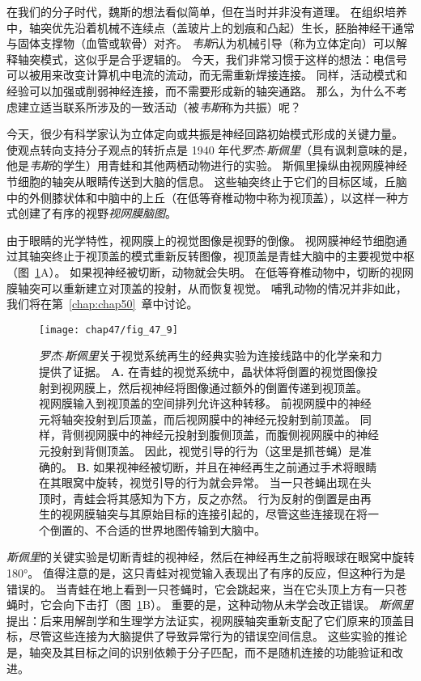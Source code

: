 在我们的分子时代，魏斯的想法看似简单，但在当时并非没有道理。
在组织培养中，轴突优先沿着机械不连续点（盖玻片上的划痕和凸起）生长，胚胎神经干通常与固体支撑物（血管或软骨）对齐。
\textit{韦斯}认为机械引导（称为立体定向）可以解释轴突模式，这似乎是合乎逻辑的。
今天，我们非常习惯于这样的想法：电信号可以被用来改变计算机中电流的流动，而无需重新焊接连接。
同样，活动模式和经验可以加强或削弱神经连接，而不需要形成新的轴突通路。
那么，为什么不考虑建立适当联系所涉及的一致活动（被\textit{韦斯}称为共振）呢？


今天，很少有科学家认为立体定向或共振是神经回路初始模式形成的关键力量。
使观点转向支持分子观点的转折点是 1940 年代\textit{罗杰$\cdot$斯佩里}（具有讽刺意味的是，他是\textit{韦斯}的学生）用青蛙和其他两栖动物进行的实验。
斯佩里操纵由视网膜神经节细胞的轴突从眼睛传送到大脑的信息。
这些轴突终止于它们的目标区域，丘脑中的外侧膝状体和中脑中的上丘（在低等脊椎动物中称为视顶盖），以这样一种方式创建了有序的视野\textit{视网膜脑图}。


由于眼睛的光学特性，视网膜上的视觉图像是视野的倒像。
视网膜神经节细胞通过其轴突终止于视顶盖的模式重新反转图像，视顶盖是青蛙大脑中的主要视觉中枢（图~\ref{fig:47_9}A）。
如果视神经被切断，动物就会失明。
在低等脊椎动物中，切断的视网膜轴突可以重新建立对顶盖的投射，从而恢复视觉。
哺乳动物的情况并非如此，我们将在第~\ref{chap:chap50}~章中讨论。


\begin{figure}[htbp]
	\centering
	\texttt{[image: chap47/fig\_47\_9]}
	\caption{\textit{罗杰$\cdot$斯佩里}关于视觉系统再生的经典实验为连接线路中的化学亲和力提供了证据。
		\textbf{A.} 在青蛙的视觉系统中，晶状体将倒置的视觉图像投射到视网膜上，然后视神经将图像通过额外的倒置传递到视顶盖。
		视网膜输入到视顶盖的空间排列允许这种转移。
		前视网膜中的神经元将轴突投射到后顶盖，而后视网膜中的神经元投射到前顶盖。
		同样，背侧视网膜中的神经元投射到腹侧顶盖，而腹侧视网膜中的神经元投射到背侧顶盖。
		因此，视觉引导的行为（这里是抓苍蝇）是准确的。
		\textbf{B.} 如果视神经被切断，并且在神经再生之前通过手术将眼睛在其眼窝中旋转，视觉引导的行为就会异常。
		当一只苍蝇出现在头顶时，青蛙会将其感知为下方，反之亦然。
		行为反射的倒置是由再生的视网膜轴突与其原始目标的连接引起的，尽管这些连接现在将一个倒置的、不合适的世界地图传输到大脑中。}
	\label{fig:47_9}
\end{figure}


\textit{斯佩里}的关键实验是切断青蛙的视神经，然后在神经再生之前将眼球在眼窝中旋转 180°。
值得注意的是，这只青蛙对视觉输入表现出了有序的反应，但这种行为是错误的。
当青蛙在地上看到一只苍蝇时，它会跳起来，当在它头顶上方有一只苍蝇时，它会向下击打（图~\ref{fig:47_9}B）。
重要的是，这种动物从未学会改正错误。
\textit{斯佩里}提出：后来用解剖学和生理学方法证实，视网膜轴突重新支配了它们原来的顶盖目标，尽管这些连接为大脑提供了导致异常行为的错误空间信息。
这些实验的推论是，轴突及其目标之间的识别依赖于分子匹配，而不是随机连接的功能验证和改进。


